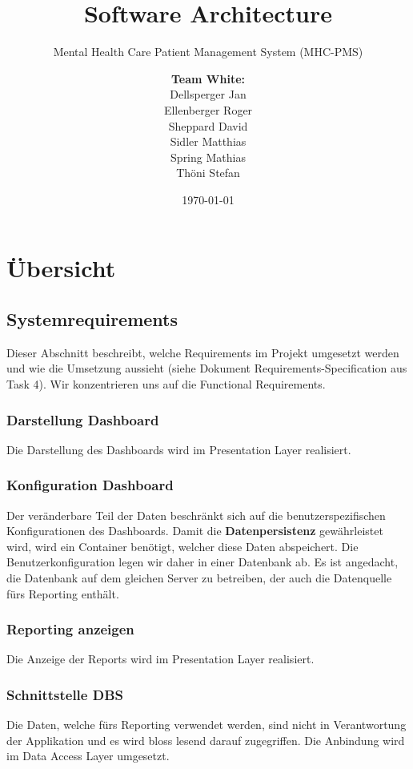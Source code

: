 \documentclass[a4paper]{scrreprt}
\title{Software Architecture}
\subtitle{Mental Health Care Patient Management System (MHC-PMS)}
\author{
\begin{tabular}{l}
\normalfont\bfseries{Team White:}\\
Dellsperger Jan\\
Ellenberger Roger\\
Sheppard David\\
Sidler Matthias\\
Spring Mathias\\
Thöni Stefan
\end{tabular}
}
\date{\today}
\begin{document}
\begin{titlepage}
	\maketitle
\end{titlepage}



\chapter{Übersicht}

\section{Systemrequirements}
Dieser Abschnitt beschreibt, welche Requirements im Projekt umgesetzt werden und wie die Umsetzung aussieht (siehe Dokument Requirements-Specification aus Task 4). Wir konzentrieren uns auf die Functional Requirements.

\subsection{Darstellung Dashboard}
Die Darstellung des Dashboards wird im Presentation Layer realisiert.

\subsection{Konfiguration Dashboard}
Der veränderbare Teil der Daten beschränkt sich auf die benutzerspezifischen Konfigurationen des Dashboards. Damit die \textbf{Datenpersistenz} gewährleistet wird, wird ein Container benötigt, welcher diese Daten abspeichert. Die Benutzerkonfiguration legen wir daher in einer Datenbank ab. Es ist angedacht, die Datenbank auf dem gleichen Server zu betreiben, der auch die Datenquelle fürs Reporting enthält.

\subsection{Reporting anzeigen}
Die Anzeige der Reports wird im Presentation Layer realisiert.

\subsection{Schnittstelle DBS} 
Die Daten, welche fürs Reporting verwendet werden, sind nicht in Verantwortung der Applikation und es wird bloss lesend darauf zugegriffen. Die Anbindung wird im Data Access Layer umgesetzt.
\end{document}
